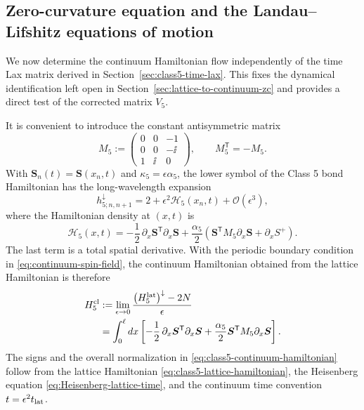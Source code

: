 \subsection{Zero-curvature equation and the Landau--Lifshitz equations of motion}
\label{sec:class5-eom}

We now determine the continuum Hamiltonian flow independently of the time Lax
matrix derived in Section~\ref{sec:class5-time-lax}.  This fixes the dynamical
identification left open in Section~\ref{sec:lattice-to-continuum-zc} and
provides a direct test of the corrected matrix $V_5$.

It is convenient to introduce the constant antisymmetric matrix
\begin{equation}
M_5
:=
\begin{pmatrix}
0&0&-1\\
0&0&-\ii\\
1&\ii&0
\end{pmatrix},
\qquad
M_5^{\mathsf T}=-M_5.
\label{eq:class5-M-definition}
\end{equation}
With $\boldsymbol S_n(t)=\boldsymbol S(x_n,t)$ and
$\kappa_5=\epsilon\alpha_5$, the lower symbol of the Class 5 bond
Hamiltonian has the long-wavelength expansion
\begin{equation}
 h_{5;n,n+1}^{\downarrow}
 =2+\epsilon^2\mathcal H_5(x_n,t)+\mathcal O(\epsilon^3),
\label{eq:class5-h-lower-expansion}
\end{equation}
where the Hamiltonian density at $(x,t)$ is
\begin{equation}
\mathcal H_5(x,t)
=
-\frac12\,\partial_x\boldsymbol S^{\mathsf T}\partial_x\boldsymbol S
+\frac{\alpha_5}{2}
\left(
\boldsymbol S^{\mathsf T}M_5\partial_x\boldsymbol S
+\partial_x S^+
\right).
\label{eq:class5-hamiltonian-density-with-boundary}
\end{equation}
The last term is a total spatial derivative.  With the periodic boundary
condition in \eqref{eq:continuum-spin-field}, the continuum Hamiltonian obtained
from the lattice Hamiltonian is therefore
\begin{align}
H^{\rm cl}_5
&:=
\lim_{\epsilon\to0}
\frac{
\bigl(H^{\rm lat}_5\bigr)^{\downarrow}-2N
}{\epsilon}
\nonumber\\
&=
\int_0^{\ell}dx\left[
-\frac12\,\partial_x\boldsymbol S^{\mathsf T}\partial_x\boldsymbol S
+\frac{\alpha_5}{2}
\boldsymbol S^{\mathsf T}M_5\partial_x\boldsymbol S
\right].
\label{eq:class5-continuum-hamiltonian}
\end{align}
The signs and the overall normalization in
\eqref{eq:class5-continuum-hamiltonian} follow from the lattice Hamiltonian
\eqref{eq:class5-lattice-hamiltonian}, the Heisenberg equation
\eqref{eq:Heisenberg-lattice-time}, and the continuum time convention
$t=\epsilon^2t_{\rm lat}$.

